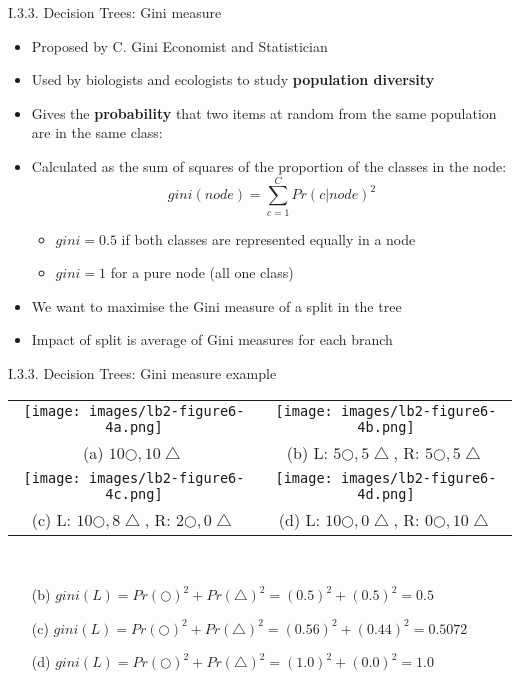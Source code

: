 \documentclass[handout]{beamer}
\newcommand{\strong}[1]{\textbf{\color{teal} #1}}
\begin{document}
\begin{frame}{I.3.3. Decision Trees: Gini measure}
\begin{itemize}
\item Proposed by C. Gini Economist and Statistician
\item Used by biologists and ecologists to study \strong{population diversity}
\item Gives the \strong{probability} that two items at random from the same population are in the same class:
\item Calculated as the sum of squares of the proportion of the classes in the node:
\[
	gini(node) = \sum_{c=1}^{C} Pr(c|node)^2
\]
\begin{itemize}
	\item $gini=0.5$ if both classes are represented equally in a node
	\item $gini=1$ for a pure node (all one class)
\end{itemize}
\item We want to maximise the Gini measure of a split in the tree
\item Impact of split is average of Gini measures for each branch
\end{itemize}
\end{frame}
\begin{frame}{I.3.3. Decision Trees: Gini measure example}
\begin{center}
\small
\begin{tabular}{cc}
\texttt{[image: images/lb2-figure6-4a.png]} &
\texttt{[image: images/lb2-figure6-4b.png]} \\
(a) $10 \bigcirc, 10 \bigtriangleup$ & 
(b) L: $5 \bigcirc, 5 \bigtriangleup$, R: $5 \bigcirc, 5 \bigtriangleup$\\
\texttt{[image: images/lb2-figure6-4c.png]} &
\texttt{[image: images/lb2-figure6-4d.png]} \\
(c) L: $10 \bigcirc, 8 \bigtriangleup$, R: $2 \bigcirc, 0 \bigtriangleup$ & 
(d) L: $10 \bigcirc, 0 \bigtriangleup$, R: $0 \bigcirc, 10 \bigtriangleup$ \\
\end{tabular}\\
\cite[Fig 6.4]{LB2:2004}
\end{center}
\begin{itemize}
\item[(b)] $gini(L) = Pr(\bigcirc)^2 + Pr(\bigtriangleup)^2 = (0.5)^2 + (0.5)^2 = 0.5$
\item[(c)] $gini(L) = Pr(\bigcirc)^2 + Pr(\bigtriangleup)^2 = (0.56)^2 + (0.44)^2 = 0.5072$
\item[(d)] $gini(L) = Pr(\bigcirc)^2 + Pr(\bigtriangleup)^2 = (1.0)^2 + (0.0)^2 = 1.0$
\end{itemize}
\end{frame}
\end{document}
